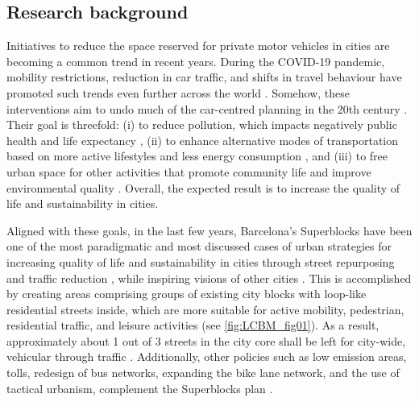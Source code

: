 \subsection{Research background}
\label{subsec:LCBM_1.1_research_back}
Initiatives to reduce the space reserved for private motor vehicles in cities \citep{Glazener2019} are becoming a common trend in recent years. During the COVID-19 pandemic, mobility restrictions, reduction in car traffic, and shifts in travel behaviour have promoted such trends even further across the world \citep{Hanzl2020,Buehler2021}. Somehow, these interventions aim to undo much of the car-centred planning in the 20th century \citep{Norton2008}. Their goal is threefold: (i) to reduce pollution, which impacts negatively public health and life expectancy \citep{Brunekreef1997}, (ii) to enhance alternative modes of transportation based on more active lifestyles and less energy consumption \citep{Woodcock2007}, and (iii) to free urban space for other activities that promote community life and improve environmental quality \citep{Nieuwenhuijsen2016}. Overall, the expected result is to increase the quality of life and sustainability in cities.

Aligned with these goals, in the last few years, Barcelona’s Superblocks have been one of the most paradigmatic and most discussed cases of urban strategies for increasing quality of life and sustainability in cities through street repurposing and traffic reduction \citep{Bausells2016,Hu2016,Morel2019,Wiedeman2018}, while inspiring visions of other cities \citep{Ortiz-Zamora2020,Pravednikova2019,Frey2020}. This is accomplished by creating areas comprising groups of existing city blocks with loop-like residential streets inside, which are more suitable for active mobility, pedestrian, residential traffic, and leisure activities  (see \cref{fig:LCBM_fig01}).  As a result, approximately about 1 out of 3 streets in the city core shall be left for city-wide, vehicular through traffic \citep{Rueda2018}. Additionally, other policies such as low emission areas, tolls, redesign of bus networks, expanding the bike lane network, and the use of tactical urbanism, complement the Superblocks plan \citep{AjuntamentdeBarcelona2020a}. 

